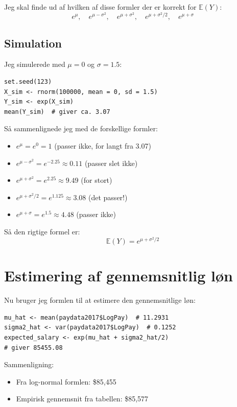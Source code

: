 \documentclass[11pt,a4paper]{article}
\begin{document}
Jeg skal finde ud af hvilken af disse formler der er korrekt for $\mathbb{E}(Y)$:
\[
e^\mu, \quad e^{\mu-\sigma^2}, \quad e^{\mu+\sigma^2}, \quad e^{\mu+\sigma^2/2}, \quad e^{\mu+\sigma}
\]

\subsection{Simulation}

Jeg simulerede med $\mu = 0$ og $\sigma = 1.5$:
\begin{lstlisting}
set.seed(123)
X_sim <- rnorm(100000, mean = 0, sd = 1.5)
Y_sim <- exp(X_sim)
mean(Y_sim)  # giver ca. 3.07
\end{lstlisting}

Så sammenlignede jeg med de forskellige formler:
\begin{itemize}
    \item $e^\mu = e^0 = 1$ (passer ikke, for langt fra 3.07)
    \item $e^{\mu - \sigma^2} = e^{-2.25} \approx 0.11$ (passer slet ikke)
    \item $e^{\mu + \sigma^2} = e^{2.25} \approx 9.49$ (for stort)
    \item $e^{\mu + \sigma^2/2} = e^{1.125} \approx 3.08$ (det passer!)
    \item $e^{\mu + \sigma} = e^{1.5} \approx 4.48$ (passer ikke)
\end{itemize}

Så den rigtige formel er:
\[
\mathbb{E}(Y) = e^{\mu + \sigma^2/2}
\]

\section{Estimering af gennemsnitlig løn}

Nu bruger jeg formlen til at estimere den gennemsnitlige løn:

\begin{lstlisting}
mu_hat <- mean(paydata2017$LogPay)  # 11.2931
sigma2_hat <- var(paydata2017$LogPay)  # 0.1252
expected_salary <- exp(mu_hat + sigma2_hat/2)
# giver 85455.08
\end{lstlisting}

Sammenligning:
\begin{itemize}
    \item Fra log-normal formlen: \$85,455
    \item Empirisk gennemsnit fra tabellen: \$85,577
\end{itemize}
\end{document}
